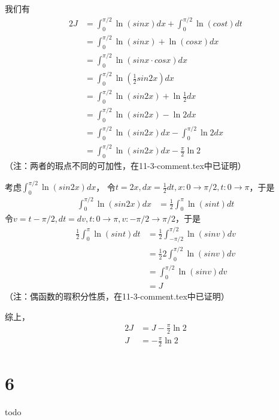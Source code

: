 \documentclass{article}
\begin{document}
\begin{itemize}
        我们有
        \begin{align*}
          2 J & = \int_{0}^{\pi/2} \ln (sin x) dx + \int_{0}^{\pi/2} \ln (cost) dt \\
              & = \int_{0}^{\pi/2} \ln (sin x) + \ln (cos x) dx                    \\
              & = \int_{0}^{\pi/2} \ln (sin x \cdot cos x) dx                      \\
              & = \int_{0}^{\pi/2} \ln (\frac{1}{2}sin 2x) dx                      \\
              & = \int_{0}^{\pi/2} \ln (sin 2x) + \ln \frac{1}{2} dx               \\
              & = \int_{0}^{\pi/2} \ln (sin 2x) - \ln 2 dx                         \\
              & = \int_{0}^{\pi/2} \ln (sin 2x) dx - \int_{0}^{\pi/2} \ln 2 dx     \\
              & = \int_{0}^{\pi/2} \ln (sin 2x) dx - \frac{\pi}{2}\ln 2
        \end{align*}
        （注：两者的瑕点不同的可加性，在11-3-comment.tex中已证明）

        考虑$\int_{0}^{\pi/2} \ln (sin 2x) dx$，
        令$t = 2x, dx = \frac{1}{2}dt, x: 0 \to \pi/2, t: 0 \to \pi$，于是
        \begin{align*}
          \int_{0}^{\pi/2} \ln (sin 2x) dx
           & = \frac{1}{2} \int_{0}^{\pi} \ln (sin t) dt
        \end{align*}
        令$v = t - \pi/2, dt = dv, t: 0 \to \pi, v: -\pi/2 \to \pi/2$，于是
        \begin{align*}
          \frac{1}{2} \int_{0}^{\pi} \ln (sin t) dt
           & = \frac{1}{2} \int_{-\pi/2}^{\pi/2} \ln (sin v) dv \\
           & = \frac{1}{2} 2 \int_{0}^{\pi/2} \ln (sin v) dv    \\
           & = \int_{0}^{\pi/2} \ln (sin v) dv                  \\
           & = J
        \end{align*}
        （注：偶函数的瑕积分性质，在11-3-comment.tex中已证明）

        综上，
        \begin{align*}
          2J & = J - \frac{\pi}{2}\ln 2 \\
          J  & =  - \frac{\pi}{2}\ln 2
        \end{align*}
\end{itemize}

\section*{6}

todo
\end{document}

